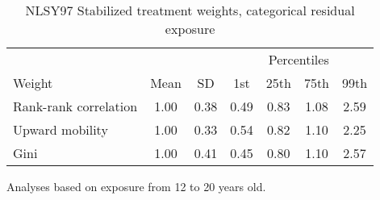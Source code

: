 \begin{table}[htp]
\centering
\footnotesize
\setlength{\tabcolsep}{10pt}
\renewcommand{\arraystretch}{1}
\begin{threeparttable}
\centering
\caption{NLSY97 Stabilized treatment weights, categorical residual exposure} 
\label{tab:ipt_weigths_qr}
\begin{tabular}{lcccccc}
  \hline
\multicolumn{3}{c}{} & \multicolumn{4}{c}{Percentiles} \\ 
 \cmidrule{4-7} 
Weight & Mean & SD & 1st & 25th & 75th & 99th \\ 
  \hline
Rank-rank correlation & 1.00 & 0.38 & 0.49 & 0.83 & 1.08 & 2.59 \\ 
  Upward mobility & 1.00 & 0.33 & 0.54 & 0.82 & 1.10 & 2.25 \\ 
  Gini & 1.00 & 0.41 & 0.45 & 0.80 & 1.10 & 2.57 \\ 
   \hline
\end{tabular}
\begin{tablenotes}
\footnotesize
\item Analyses based on exposure from 12 to 20 years old. 
\end{tablenotes}
\end{threeparttable}
\end{table}
